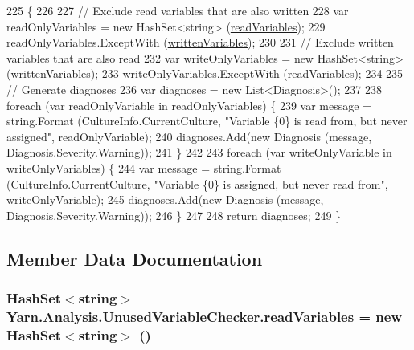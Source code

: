 \begin{DoxyCode}
225         \{
226 
227             \textcolor{comment}{// Exclude read variables that are also written}
228             var readOnlyVariables = \textcolor{keyword}{new} HashSet<string> (\hyperlink{a00185_a6b542092ddce1b92c9455d60899518a9}{readVariables});
229             readOnlyVariables.ExceptWith (\hyperlink{a00185_a0c2fe6eded1b10b135ca2469f5980a39}{writtenVariables});
230 
231             \textcolor{comment}{// Exclude written variables that are also read}
232             var writeOnlyVariables = \textcolor{keyword}{new} HashSet<string> (\hyperlink{a00185_a0c2fe6eded1b10b135ca2469f5980a39}{writtenVariables});
233             writeOnlyVariables.ExceptWith (\hyperlink{a00185_a6b542092ddce1b92c9455d60899518a9}{readVariables});
234 
235             \textcolor{comment}{// Generate diagnoses}
236             var diagnoses = \textcolor{keyword}{new} List<Diagnosis>();
237 
238             \textcolor{keywordflow}{foreach} (var readOnlyVariable \textcolor{keywordflow}{in} readOnlyVariables) \{
239                 var message = string.Format (CultureInfo.CurrentCulture, \textcolor{stringliteral}{"Variable \{0\} is read from, but
       never assigned"}, readOnlyVariable);
240                 diagnoses.Add(\textcolor{keyword}{new} Diagnosis (message, Diagnosis.Severity.Warning));
241             \}
242 
243             \textcolor{keywordflow}{foreach} (var writeOnlyVariable \textcolor{keywordflow}{in} writeOnlyVariables) \{
244                 var message = string.Format (CultureInfo.CurrentCulture, \textcolor{stringliteral}{"Variable \{0\} is assigned, but
       never read from"}, writeOnlyVariable);
245                 diagnoses.Add(\textcolor{keyword}{new} Diagnosis (message, Diagnosis.Severity.Warning));
246             \}
247 
248             \textcolor{keywordflow}{return} diagnoses;
249         \}
\end{DoxyCode}


\subsection{Member Data Documentation}
\hypertarget{a00185_a6b542092ddce1b92c9455d60899518a9}{
\subsubsection[{read\-Variables}]{\setlength{\rightskip}{0pt plus 5cm}Hash\-Set$<$string$>$ Yarn.\-Analysis.\-Unused\-Variable\-Checker.\-read\-Variables = new Hash\-Set$<$string$>$ ()\hspace{0.3cm}{\ttfamily [private]}}}\label{a00185_a6b542092ddce1b92c9455d60899518a9}


